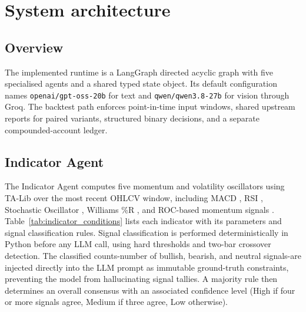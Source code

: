 \section{System architecture}
\label{sec:systemarchitecture}
\subsection{Overview}

The implemented runtime is a LangGraph directed acyclic graph with five specialised agents and a shared typed state object. Its default configuration names \texttt{openai/gpt-oss-20b} for text and \texttt{qwen/qwen3.8-27b} for vision through Groq. The backtest path enforces point-in-time input windows, shared upstream reports for paired variants, structured binary decisions, and a separate compounded-account ledger.

\subsection{Indicator Agent}
The Indicator Agent computes five momentum and volatility oscillators using TA-Lib over the most recent OHLCV window, including MACD \cite{appel2005technical}, RSI \cite{wilder1978new}, Stochastic Oscillator \cite{lane1984stochastic}, Williams \%R \cite{williams1973trading}, and ROC-based momentum signals \cite{murphy1999technical}. Table~\ref{tab:indicator_conditions} lists each indicator with its parameters and signal classification rules. Signal classification is performed deterministically in Python before any LLM call, using hard thresholds and two-bar crossover detection. The classified counts-number of bullish, bearish, and neutral signals-are injected directly into the LLM prompt as immutable ground-truth constraints, preventing the model from hallucinating signal tallies. A majority rule then determines an overall consensus with an associated confidence level (High if four or more signals agree, Medium if three agree, Low otherwise).

